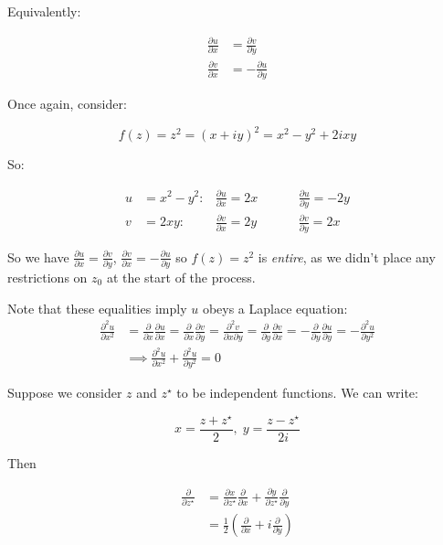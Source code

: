\documentclass{physics_notes}
\begin{document}
Equivalently:

\begin{align*}
\frac{\partial u}{\partial x} &= \frac{\partial v}{\partial y} \\
\frac{\partial v}{\partial x} &= -\frac{\partial u}{\partial y}
\end{align*}

Once again, consider: 

\[ f(z) = z^2 = (x + iy)^2 = x^2 - y^2 + 2ixy \]

So:

\begin{align*}
u &= x^2 - y^2 :  & \frac{\partial u}{\partial x} = 2x \hspace{1cm} & \frac{\partial u}{\partial y} = -2y \\
v &= 2xy : & \frac{\partial v}{\partial x} = 2y \hspace{1cm} & \frac{\partial v}{\partial y} = 2x 
\end{align*}

So we have $\frac{\partial u}{\partial x} = \frac{\partial v}{\partial y}$, $\frac{\partial v}{\partial x} = -\frac{\partial u}{\partial y}$ so $f(z) = z^2$ is \emph{entire}, as we didn't place any restrictions on $z_0$ at the start of the process. 

Note that these equalities imply $u$ obeys a Laplace equation:
\begin{align*}
\frac{\partial^2 u}{\partial x^2} &= \frac{\partial}{\partial x}\frac{\partial u}{\partial x} = \frac{\partial}{\partial x} \frac{\partial v}{\partial y} = \frac{\partial^2 v}{\partial x \partial y} = \frac{\partial}{\partial y}\frac{\partial v}{\partial x} = -\frac{\partial}{\partial y}\frac{\partial u}{\partial y} = -\frac{\partial^2 u}{\partial y^2} \\
&\implies \frac{\partial^2 u}{\partial x^2} + \frac{\partial^2 u}{\partial y^2} = 0
\end{align*}

Suppose we consider $z$ and $z^\star$ to be independent functions. We can write:

\[ x = \frac{z + z^\star}{2}, \; y = \frac{z - z^\star}{2i} \]

Then 

\begin{align*} 
\frac{\partial}{\partial z^\star} &= \frac{\partial x}{\partial z^\star}\frac{\partial}{\partial x} + \frac{\partial y}{\partial z^\star}\frac{\partial}{\partial y}\\
&= \frac{1}{2}\left(\frac{\partial}{\partial x} + i\frac{\partial}{\partial y} \right)
\end{align*}
\end{document}

